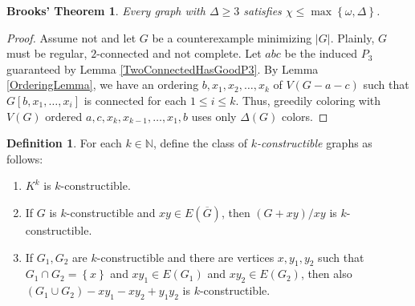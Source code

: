 \documentclass[12pt]{article}
\theoremstyle{plain}
\newtheorem*{Brooks}{Brooks' Theorem}
\theoremstyle{definition}
\newtheorem{defn}{Definition}[section]
\theoremstyle{remark}
\newcommand{\set}[1]{\left\{ #1 \right\}}
\newcommand{\card}[1]{\left|#1\right|}
\begin{document}
\begin{Brooks}
Every graph with $\Delta \geq 3$ satisfies $\chi \leq \max\set{\omega, \Delta}$.
\end{Brooks}
\begin{proof}
Assume not and let $G$ be a counterexample minimizing $\card{G}$.  Plainly, $G$ must be regular, $2$-connected and not complete.  Let $abc$ be the induced $P_3$ guaranteed by Lemma \ref{TwoConnectedHasGoodP3}.  By Lemma \ref{OrderingLemma}, we have an ordering $b, x_1, x_2, \ldots, x_k$ of $V(G - a - c)$ such that $G\left[b, x_1 ,\ldots, x_i\right]$ is connected for each $1 \leq i \leq k$.  Thus, greedily coloring with $V(G)$ ordered $a, c, x_k, x_{k-1}, \ldots, x_1, b$ uses only $\Delta(G)$ colors.
\end{proof}


\begin{defn}
For each $k \in \mathbb{N}$, define the class of \emph{$k$-constructible} graphs as follows:

\begin{enumerate}
\item $K^k$ is $k$-constructible.
\item If $G$ is $k$-constructible and $xy \in E(\overline{G})$, then $(G + xy) / xy$ is $k$-constructible.
\item If $G_1, G_2$ are $k$-constructible and there are vertices $x, y_1, y_2$ such that $G_1 \cap G_2 = \set{x}$ and $xy_1 \in E(G_1)$ and $xy_2 \in E(G_2)$, then also $(G_1 \cup G_2) - xy_1 - xy_2 + y_1y_2$ is $k$-constructible.
\end{enumerate}
\end{defn}
\end{document}
